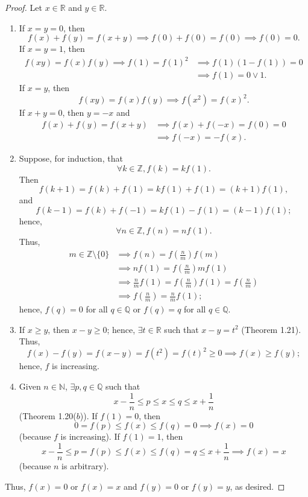 \documentclass{amsart}
\theoremstyle{definition}
\begin{document}
\begin{proof}
    Let $x \in \mathbb{R}$ and $y \in \mathbb{R}$.
    \begin{enumerate}[label = (\alph*)]
        \item If $x = y = 0$, then 
        \[
        f(x) + f(y) = f(x+y) \implies f(0) + f(0) = f(0) \implies f(0) = 0.
        \]
        If $x = y = 1$, then
        \begin{align*}
        f(xy) = f(x)f(y) \implies f(1) = f(1)^2 &\implies f(1)(1-f(1)) = 0 \\
        &\implies f(1) = 0 \lor 1.
        \end{align*}
        If $x = y$, then
        \[
        f(xy) = f(x)f(y) \implies f(x^2) = f(x)^2.
        \]
        If $x+y = 0$, then $y = -x$ and 
        \begin{align*}
        f(x) + f(y) = f(x+y) &\implies f(x) + f(-x) = f(0) = 0 \\
        &\implies f(-x) = -f(x).            
        \end{align*}    
        \item Suppose, for induction, that 
        \[
        \forall k \in \mathbb{Z}, f(k) = kf(1).
        \]
        Then 
        \[
        f(k+1) = f(k) + f(1) = kf(1) + f(1) = (k+1)f(1), 
        \]
        and 
        \[
        f(k-1) = f(k) + f(-1) = kf(1) - f(1) = (k-1)f(1);
        \]
        hence,
        \[
        \forall n \in \mathbb{Z}, f(n) = nf(1). 
        \]
        Thus,
        \begin{align*}
            m \in \mathbb{Z} \setminus \{0\} &\implies f(n) = f\left(\frac{n}{m}\right)f(m) \\
            &\implies nf(1) = f\left(\frac{n}{m}\right)mf(1) \\
            &\implies \frac{n}{m}f(1) = f\left(\frac{n}{m}\right)f(1) = f\left(\frac{n}{m}\right) \\ 
            &\implies f\left(\frac{n}{m}\right) = \frac{n}{m}f(1);
        \end{align*}
        hence, $f(q) = 0$ for all $q \in \mathbb{Q}$ or $f(q) = q$ for all $q \in \mathbb{Q}$.
        \item If $x \geq y$, then $x-y \geq 0$; hence, $\exists t \in \mathbb{R}$ such that $x-y = t^2$ (Theorem 1.21). Thus,
        \[
        f(x) - f(y) = f(x-y) = f(t^2) = f(t)^2 \geq 0 \implies f(x) \geq f(y);
        \]
        hence, $f$ is increasing.
        \item Given $n \in \mathbb{N}$, $\exists p,q \in \mathbb{Q}$ such that 
        \[
        x - \frac{1}{n} \leq p \leq x \leq q \leq x + \frac{1}{n}
        \]
        (Theorem 1.20($b$)). If $f(1) = 0$, then 
        \[
        0 = f(p) \leq f(x) \leq f(q) = 0 \implies f(x) = 0
        \]
        (because $f$ is increasing).
        If $f(1) = 1$, then 
        \[
        x - \frac{1}{n} \leq p = f(p) \leq f(x) \leq f(q) = q \leq x + \frac{1}{n} \implies f(x) = x
        \]
        (because $n$ is arbitrary).
    \end{enumerate}
    Thus, $f(x) = 0$ or $f(x) = x$ and $f(y) = 0$ or $f(y) = y$, as desired.
\end{proof}
\end{document}
